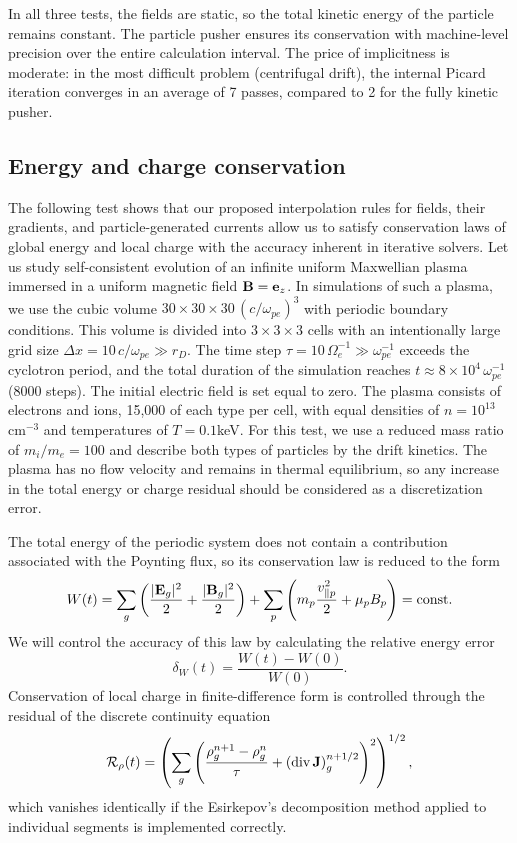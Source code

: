 \documentclass[final,3p]{elsarticle}
\newcommand{\diverg}{\mbox{\rm{div\,}}}
\begin{document}
In all three tests, the fields are static, so the total kinetic energy of the particle remains constant. The particle pusher ensures its conservation with machine-level precision over the entire calculation interval. The price of implicitness is moderate: in the most difficult problem (centrifugal drift), the internal Picard iteration converges in an average of 7 passes, compared to 2 for the fully kinetic pusher.


\subsection{Energy and charge conservation}
 

The following test shows that our proposed interpolation rules for fields, their gradients, and particle-generated currents allow us to satisfy conservation laws of global energy and local charge with the accuracy inherent in iterative solvers.  Let us study self-consistent evolution of an infinite uniform Maxwellian plasma immersed in a uniform magnetic field ${\bf B}={\bf e}_z$. In simulations of such a plasma, we use the cubic volume $30\times30\times30\,(c/\omega_{pe})^3$ with periodic boundary conditions. This volume is divided into $3\times3\times3$ cells with an intentionally large grid size $\Delta x=10\,c/\omega_{pe}\gg r_D$. The time step $\tau=10\,\Omega_e^{-1}\gg\omega_{pe}^{-1}$ exceeds the cyclotron period, and the total duration of the simulation reaches $t\approx8\times10^{4}\,\omega_{pe}^{-1}$ (8000 steps). The initial electric field is set equal to zero.
The plasma consists of electrons and ions, 15,000 of each type per cell, with equal densities of $n = 10^{13}$cm$^{-3}$ and temperatures of $T = 0.1$keV. For this test, we use a reduced mass ratio of $m_i/m_e = 100$ and describe both types of particles by the drift kinetics. The plasma has no flow velocity and remains in thermal equilibrium, so any increase in the total energy or charge residual should be considered as a discretization error.

The total energy of the periodic system does not contain a contribution associated with the Poynting flux, so its conservation law is reduced to the form 
\begin{equation}\label{Wtot}
	W(t)=\sum\limits_g\left(\frac{|{\bf E}_g|^2}{2}+\frac{|{\bf B}_g|^2}{2}\right)+\sum\limits_p\left(m_p\frac{v_{\|p}^2}{2}+\mu_p B_p\right)=\mbox{\rm const}.
\end{equation}
We will control the accuracy of this law by calculating the relative energy error
\begin{equation}\label{deltW}
    \delta_W(t) = \frac{W(t)-W(0)}{W(0)}.
\end{equation}
Conservation of local charge in finite-difference form is controlled through the residual of the discrete continuity equation
\begin{equation}\label{charge_resid}
	\mathcal{R}_\rho(t) = \left(\sum_g\left(\frac{\rho_g^{n+1}-\rho_g^n}{\tau} + \left(\diverg{\bf J}\right)_g^{n+1/2}\right)^2\right)^{1/2},
\end{equation}
which vanishes identically if the Esirkepov's decomposition method applied to individual segments  is implemented correctly.
 
\end{document}
